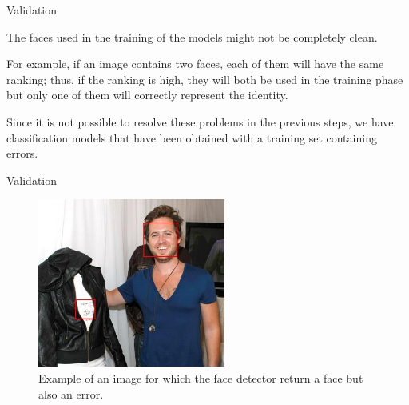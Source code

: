 \begin{tframe}{Validation}

The faces used in the training of the models might not be completely clean.

\vspace{0.1in}

For example, if an image contains two faces, each of them will have the same ranking; thus, if the ranking is high, they will both be used in the training phase but only one of them will correctly represent the identity. 

\vspace{0.1in}

Since it is not possible to resolve these problems in the previous steps, we have classification models that have been obtained with a training set containing errors.

\end{tframe}


\begin{tframe}{Validation}

\begin{figure}[h]
\begin{center}
\includegraphics[width=0.55\textwidth]{images/image1a.jpg}
\end{center}
  \caption{Example of an image for which the face detector return a face but also an error.}
\label{fig:validation}
\end{figure}

\end{tframe}


